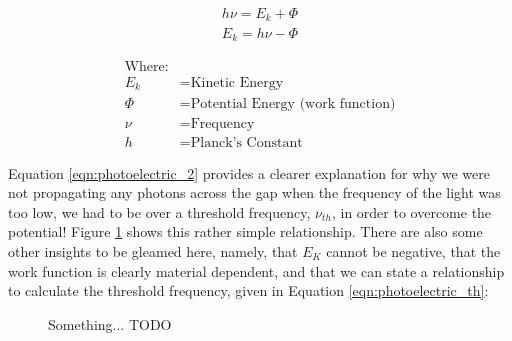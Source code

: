 \documentclass[../../Quantum-Technologies-Notes]{subfiles}
\begin{document}
		
		\medskip
		
		
			\begin{paracol}{2}
				
				\fontsize{14pt}{15pt}\selectfont
				
				\begin{gather}
					\label{eqn:photoelectric_1} \Planckconst \nu = E_k + \Phi \\
					\label{eqn:photoelectric_2} E_k = \Planckconst \nu - \Phi
				\end{gather}
				
				\switchcolumn
				
				\fontsize{11pt}{12pt}\selectfont
				
				\vspace{-10mm}
				\begin{align*}
					\text{Where:}& \\
					E_k &= \text{Kinetic Energy} \\
					\Phi &= \text{Potential Energy (work function)} \\
					\nu &= \text{Frequency} \\
					\Planckconst &= \text{Planck's Constant}
				\end{align*}
			\end{paracol}
			
			\columnratio{0.7}
			\begin{paracol}{2}
				Equation \ref{eqn:photoelectric_2} provides a clearer explanation for why we were not propagating any photons across the gap when the frequency of the light was too low, we had to be over a threshold frequency, $\nu_{th}$, in order to overcome the potential! \linebreak
				Figure \ref{fig:photoelectric_effect_threshold} shows this rather simple relationship. There are also some other insights to be gleamed here, namely, that $E_K$ cannot be negative, that the work function is clearly material dependent, and that we can state a relationship to calculate the threshold frequency, given in Equation \ref{eqn:photoelectric_th}:
				
				\switchcolumn
				\begin{figure}[!h]
					\centering
					
					\caption{Something... TODO } %
					\label{fig:photoelectric_effect_threshold}
				\end{figure}
			\end{paracol}
			
\end{document}
